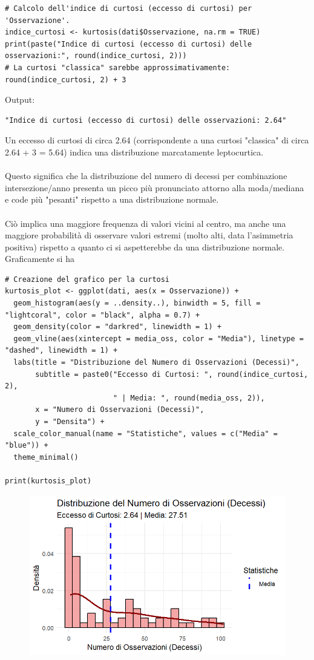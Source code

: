 \documentclass[14pt, openany, titlepage]{report} %
\begin{document}
\begin{center}
\begin{lstlisting}[breaklines=true]
# Calcolo dell'indice di curtosi (eccesso di curtosi) per 'Osservazione'.
indice_curtosi <- kurtosis(dati$Osservazione, na.rm = TRUE)
print(paste("Indice di curtosi (eccesso di curtosi) delle osservazioni:", round(indice_curtosi, 2)))
# La curtosi "classica" sarebbe approssimativamente: round(indice_curtosi, 2) + 3
\end{lstlisting}
\end{center}
\noindent
Output:
\begin{verbatim}
"Indice di curtosi (eccesso di curtosi) delle osservazioni: 2.64" 
\end{verbatim}
Un eccesso di curtosi di circa 2.64 (corrispondente a una curtosi
 "classica" di circa 2.64 + 3 = 5.64) indica una distribuzione 
 marcatamente leptocurtica.\\\\
 \noindent
  Questo significa che la distribuzione 
 del numero di decessi per combinazione intersezione/anno presenta
  un picco più pronunciato attorno alla moda/mediana e code più 
  "pesanti" rispetto a una distribuzione normale. \\\\
  \noindent
  Ciò implica una 
  maggiore frequenza di valori vicini al centro, ma anche una
   maggiore probabilità di osservare valori estremi (molto alti,
    data l'asimmetria positiva) rispetto a quanto ci si aspetterebbe 
    da una distribuzione normale.\\

\noindent
Graficamente si ha
\begin{center}
\begin{lstlisting}[breaklines=true]
# Creazione del grafico per la curtosi
kurtosis_plot <- ggplot(dati, aes(x = Osservazione)) +
  geom_histogram(aes(y = ..density..), binwidth = 5, fill = "lightcoral", color = "black", alpha = 0.7) +
  geom_density(color = "darkred", linewidth = 1) +
  geom_vline(aes(xintercept = media_oss, color = "Media"), linetype = "dashed", linewidth = 1) +
  labs(title = "Distribuzione del Numero di Osservazioni (Decessi)",
       subtitle = paste0("Eccesso di Curtosi: ", round(indice_curtosi, 2),
                         " | Media: ", round(media_oss, 2)),
       x = "Numero di Osservazioni (Decessi)",
       y = "Densita") +
  scale_color_manual(name = "Statistiche", values = c("Media" = "blue")) +
  theme_minimal()

print(kurtosis_plot)

\end{lstlisting}
\end{center}


\begin{figure}[H] 
    \centering
    \includegraphics[width=12cm, height=7cm]{Rplot07.png} 
\end{figure}
\end{document}
